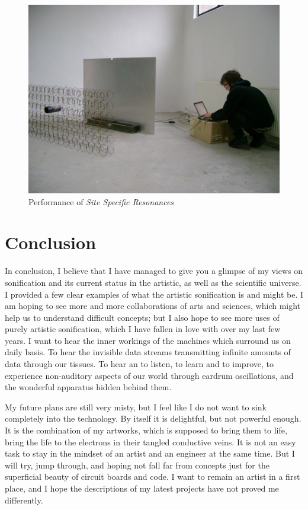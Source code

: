 \documentclass[12pt,a4paper,oneside]{report}
\begin{document}
\begin{figure}  
  \centering
    \includegraphics[width=1\textwidth]{img/sitespec}
        \caption{Performance of \emph{Site Specific Resonances}}
        \label{fig:sitespecimg}
\end{figure}

\chapter{Conclusion}
In conclusion, I believe that I have managed to give you a glimpse of my views on sonification and its current status in the artistic, as well as the scientific universe. I provided a few clear examples of what the artistic sonification is and might be. I am hoping to see more and more collaborations of arts and sciences, which might help us to understand difficult concepts; but I also hope to see more uses of purely artistic sonification, which I have fallen in love with over my last few years. I want to hear the inner workings of the machines which surround us on daily basis. To hear the invisible data streams transmitting infinite amounts of data through our tissues. To hear an to listen, to learn and to improve, to experience non-auditory aspects of our world through eardrum oscillations, and the wonderful apparatus hidden behind them.

My future plans are still very misty, but I feel like I do not want to sink completely into the technology. By itself it is delightful, but not powerful enough. It is the combination of my artworks, which is supposed to bring them to life, bring the life to the electrons in their tangled conductive veins. It is not an easy task to stay in the mindset of an artist and an engineer at the same time. But I will try, jump through, and hoping not fall far from concepts just for the superficial beauty of circuit boards and code. I want to remain an artist in a first place, and I hope the descriptions of my latest projects have not proved me differently. 
\end{document}
